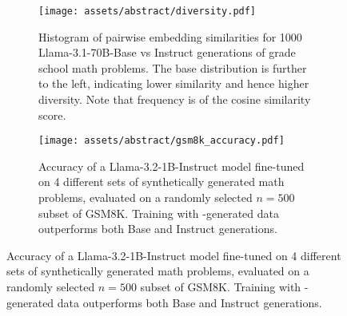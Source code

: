 \begin{figure}[t!]
    \centering
    \begin{subfigure}{}
        \centering
        \texttt{[image: assets/abstract/diversity.pdf]}
        \caption{Histogram of pairwise embedding similarities for 1000 Llama-3.1-70B-Base vs Instruct generations of grade school math problems. The base distribution is further to the left, indicating lower similarity and hence higher diversity. Note that frequency is of the cosine similarity score.}
        \label{abstract-diversity}
    \end{subfigure}
    \begin{subfigure}{}
        \centering
        \texttt{[image: assets/abstract/gsm8k\_accuracy.pdf]}
        \caption{Accuracy of a Llama-3.2-1B-Instruct model fine-tuned on 4 different sets of synthetically generated math problems, evaluated on a randomly selected $n=500$ subset of GSM8K. Training with \Sys{}-generated data outperforms both Base and Instruct generations.}
        \label{abstract-accuracy}
    \end{subfigure}
    \vskip -0.2in
\end{figure}
